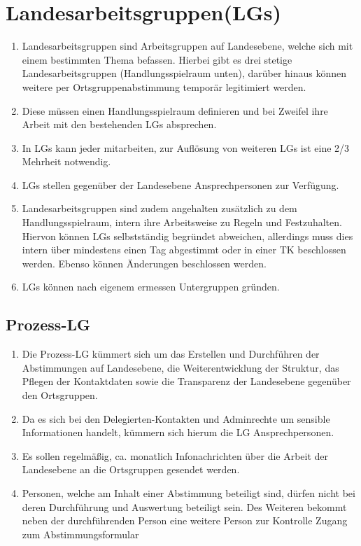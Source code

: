 \documentclass[a4paper,
  ]{scrartcl}
\begin{document}
\section{Landesarbeitsgruppen(LGs)}
\begin{enumerate}
      \item
            Landesarbeitsgruppen sind Arbeitsgruppen auf Landesebene, welche sich mit einem bestimmten Thema
            befassen. Hierbei gibt es drei stetige Landesarbeitsgruppen (Handlungsspielraum unten), darüber hinaus
            können weitere per Ortsgruppenabstimmung temporär legitimiert werden.
      \item
            Diese müssen einen
            Handlungsspielraum definieren und bei Zweifel ihre Arbeit mit den bestehenden LGs absprechen.
      \item
            In LGs
            kann jeder mitarbeiten, zur Auflösung von weiteren LGs ist eine 2/3 Mehrheit notwendig.
      \item
            LGs stellen
            gegenüber der Landesebene Ansprechpersonen zur Verfügung.
      \item
            Landesarbeitsgruppen sind zudem angehalten zusätzlich zu dem Handlungsspielraum, intern ihre
            Arbeitsweise zu Regeln und Festzuhalten. Hiervon können LGs selbstständig begründet abweichen,
            allerdings muss dies intern über mindestens einen Tag abgestimmt oder in einer TK beschlossen werden.
            Ebenso können Änderungen beschlossen werden.
      \item
            LGs können nach eigenem ermessen Untergruppen gründen.
\end{enumerate}

\subsection{Prozess-LG}
\begin{enumerate}
      \item Die Prozess-LG kümmert sich um das Erstellen und Durchführen der Abstimmungen auf
            Landesebene, die Weiterentwicklung der Struktur, das Pflegen der Kontaktdaten sowie die
            Transparenz der Landesebene gegenüber den Ortsgruppen.
      \item Da es sich bei den Delegierten-Kontakten und Adminrechte um sensible Informationen handelt,
            kümmern sich hierum die LG Ansprechpersonen.
      \item Es sollen regelmäßig, ca. monatlich Infonachrichten über die Arbeit der Landesebene an die
            Ortsgruppen gesendet werden.
      \item Personen, welche am Inhalt einer Abstimmung beteiligt sind, dürfen nicht bei deren Durchführung
            und Auswertung beteiligt sein. Des Weiteren bekommt neben der durchführenden Person eine
            weitere Person zur Kontrolle Zugang zum Abstimmungsformular
\end{enumerate}
\end{document}
